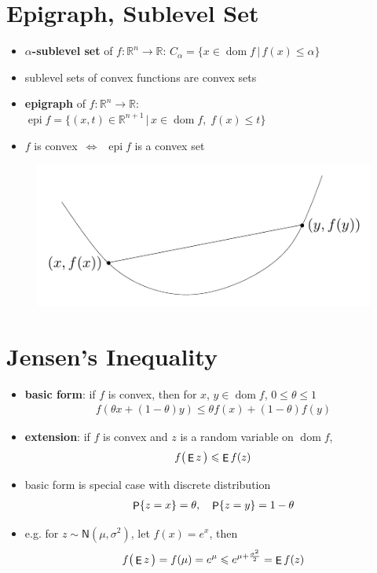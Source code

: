 \documentclass[11pt]{extarticle}
\newcommand{\ds}{\displaystyle}
\newcommand{\ifff}{\,\Longleftrightarrow\,}
\DeclareMathOperator*{\dom}{dom}
\DeclareMathOperator\prb{{\sf P}}
\DeclareMathOperator\expc{{\sf E}}
\DeclareMathOperator*{\epi}{epi}
\theoremstyle{definition}
\begin{document}
\section*{Epigraph, Sublevel Set}
\begin{itemize}
  \item {\bf $\alpha$-sublevel set} of $f:\mathbb{R}^n\to\mathbb{R}$: $\ds C_\alpha = \{x\in\dom f\,|\, f(x)\leqslant\alpha\}$
  \item sublevel sets of convex functions are convex sets
  \item {\bf epigraph} of $f: \mathbb{R}^n\to\mathbb{R}$: \\ $\ds\epi f = \{(x, t)\in\mathbb{R}^{n+1}\,|\,x\in\dom f,\; f(x)\leqslant t\}$
  \item $f$ is convex $\ifff$ $\ds\epi f$ is a convex set
\end{itemize}
\vspace{-1em}
\begin{figure}[!htbp]
  \centering
  \includegraphics[scale=0.8,page=5]{fig/03.pdf}
\end{figure}

\newpage

\section*{Jensen's Inequality}

\begin{itemize}
  \item {\bf basic form}: if $f$ is convex, then for $x$, $y\in\dom f$, $0\leqslant\theta\leqslant 1$
    \begin{align*}
      f(\theta x + (1 - \theta) y) \leqslant \theta f(x) + (1 - \theta) f(y)
    \end{align*}
  \item {\bf extension}: if $f$ is convex and $z$ is a random variable on $\dom f$,
    \begin{align*}
      f\big(\expc{z}\,\big) \leqslant \expc{f(z)}
    \end{align*}
  \item basic form is special case with discrete distribution
    \begin{align*}
      \prb\{z = x\} = \theta,\quad\prb\{z = y\} = 1 - \theta
    \end{align*}
  \item e.g. for $\ds z\sim\mathsf{N}(\mu,\sigma^2)$, let $\ds f(x) = e^x$, then
    \begin{align*}
      f\big(\expc{z}\,\big) = f(\mu) = e^{\mu}\leqslant e^{\mu + \frac{\sigma^2}{2}} = \expc{f(z)}
    \end{align*}
\end{itemize}
\end{document}

